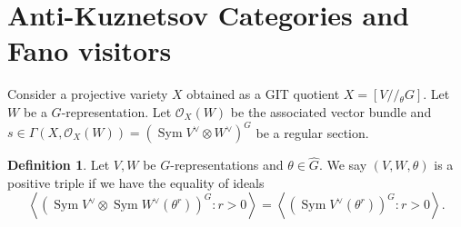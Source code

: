 \documentclass[reqno, 12pt]{amsart}
\theoremstyle{definition}
\newtheorem{definition}[theorem]{Definition}
\newtheorem{remark}[theorem]{Remark}
\newcommand{\op}[1]{\operatorname{#1}}
\newcommand{\modmod}[1]{/ \! \! / \!_{#1}}
\newcommand{\newterm}{\textsf}
\newcommand{\dbcoh}[1]{\operatorname{D}^{\operatorname{b}}(\operatorname{coh }#1)}
\newcommand{\dabs}{\op{D}^{\op{abs}}}
\def\Q{\op{\mathbb{Q}}}
\numberwithin{equation}{section}
\begin{document}


\section{Anti-Kuznetsov Categories and Fano visitors}\label{sec:FanoVisitors}
Consider a projective variety $X$ obtained as a GIT quotient $X = [V\modmod{\theta} G]$.  
Let $W$ be a $G$-representation.  Let $\mathcal O_X(W)$ be the associated vector bundle and $s \in \Gamma(X, \mathcal O_X(W)) = (\op{Sym}  V^\vee \otimes W^\vee)^G$ be a regular section.
\begin{definition}\label{def:positive throuple}
    Let $V,W$ be $G$-representations and $\theta\in \widehat{G}$. We say $(V,W,\theta)$ is a \newterm{positive triple} if we have the equality of ideals
      \begin{equation}\label{eq: christmas miracle}
    \left\langle(\op{Sym} V^\vee \otimes \op{Sym} W^\vee(\theta^r))^G: r >0\right\rangle =\left\langle(\op{Sym} V^\vee (\theta^r))^G: r>0\right\rangle.
    \end{equation}
\end{definition}
\end{document}
